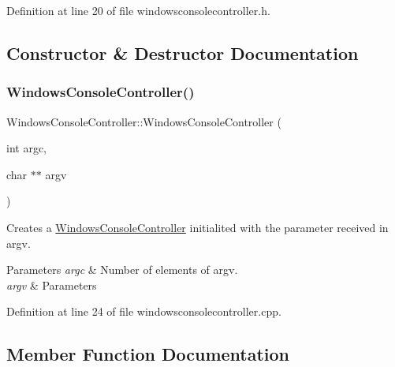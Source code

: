 Definition at line 20 of file windowsconsolecontroller.\+h.



\subsection{Constructor \& Destructor Documentation}
\mbox{\label{classWindowsConsoleController_a684161508236414615ee30bc9b29b79f}} 
\subsubsection{\texorpdfstring{Windows\+Console\+Controller()}{WindowsConsoleController()}}
{\footnotesize\ttfamily Windows\+Console\+Controller\+::\+Windows\+Console\+Controller (\begin{DoxyParamCaption}\item[{int}]{argc,  }\item[{char $\ast$$\ast$}]{argv }\end{DoxyParamCaption})}



Creates a \mbox{\hyperlink{classWindowsConsoleController}{Windows\+Console\+Controller}} initialited with the parameter received in argv. 


\begin{DoxyParams}{Parameters}
{\em argc} & Number of elements of argv. \\
\hline
{\em argv} & Parameters \\
\hline
\end{DoxyParams}


Definition at line 24 of file windowsconsolecontroller.\+cpp.



\subsection{Member Function Documentation}
\mbox{\label{classWindowsConsoleController_afca6af922fe103845177580d6af4859e}} 
